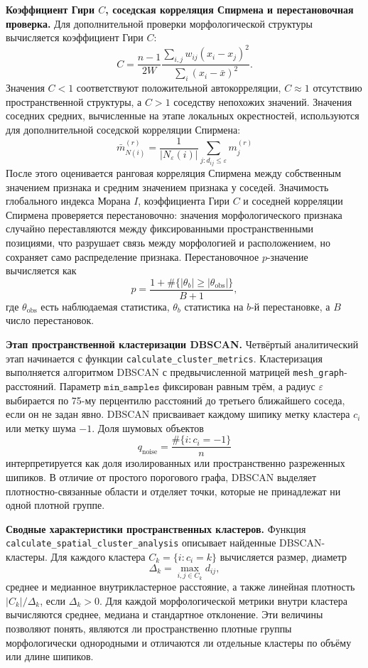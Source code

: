 \documentclass[12pt,a4paper]{article}
\begin{document}
\noindent\textbf{Коэффициент Гири \(C\), соседская корреляция Спирмена и перестановочная проверка.}
Для дополнительной проверки морфологической структуры вычисляется коэффициент Гири \(C\):
\[
C=\frac{n-1}{2W}\frac{\sum_{i,j}w_{ij}(x_i-x_j)^2}{\sum_i(x_i-\bar x)^2}.
\]
Значения \(C<1\) соответствуют положительной автокорреляции, \(C\approx1\) отсутствию пространственной структуры, а \(C>1\) соседству непохожих значений. Значения соседних средних, вычисленные на этапе локальных окрестностей, используются для дополнительной соседской корреляции Спирмена:
\[
\bar m_{N(i)}^{(r)}=\frac{1}{|N_\varepsilon(i)|}\sum_{j:d_{ij}\leq\varepsilon}m_j^{(r)}
\]
После этого оценивается ранговая корреляция Спирмена между собственным значением признака и средним значением признака у соседей. Значимость глобального индекса Морана \(I\), коэффициента Гири \(C\) и соседней корреляции Спирмена проверяется перестановочно: значения морфологического признака случайно переставляются между фиксированными пространственными позициями, что разрушает связь между морфологией и расположением, но сохраняет само распределение признака. Перестановочное \(p\)-значение вычисляется как
\[
p=\frac{1+\#\{|\theta_b|\geq|\theta_{\mathrm{obs}}|\}}{B+1},
\]
где \(\theta_{\mathrm{obs}}\) есть наблюдаемая статистика, \(\theta_b\) статистика на \(b\)-й перестановке, а \(B\) число перестановок.

\noindent\textbf{Этап пространственной кластеризации DBSCAN.}
Четвёртый аналитический этап начинается с функции \texttt{calculate\_cluster\_metrics}. Кластеризация выполняется алгоритмом DBSCAN с предвычисленной матрицей \texttt{mesh\_graph}-расстояний. Параметр \(\texttt{min\_samples}\) фиксирован равным трём, а радиус \(\varepsilon\) выбирается по 75-му перцентилю расстояний до третьего ближайшего соседа, если он не задан явно. DBSCAN присваивает каждому шипику метку кластера \(c_i\) или метку шума \(-1\). Доля шумовых объектов
\[
q_{\mathrm{noise}}=\frac{\#\{i:c_i=-1\}}{n}
\]
интерпретируется как доля изолированных или пространственно разреженных шипиков. В отличие от простого порогового графа, DBSCAN выделяет плотностно-связанные области и отделяет точки, которые не принадлежат ни одной плотной группе.

\noindent\textbf{Сводные характеристики пространственных кластеров.}
Функция \texttt{calculate\_spatial\_cluster\_analysis} описывает найденные DBSCAN-кластеры. Для каждого кластера \(C_k=\{i:c_i=k\}\) вычисляется размер, диаметр
\[
\Delta_k=\max_{i,j\in C_k}d_{ij},
\]
среднее и медианное внутрикластерное расстояние, а также линейная плотность \(|C_k|/\Delta_k\), если \(\Delta_k>0\). Для каждой морфологической метрики внутри кластера вычисляются среднее, медиана и стандартное отклонение. Эти величины позволяют понять, являются ли пространственно плотные группы морфологически однородными и отличаются ли отдельные кластеры по объёму или длине шипиков.
\end{document}
